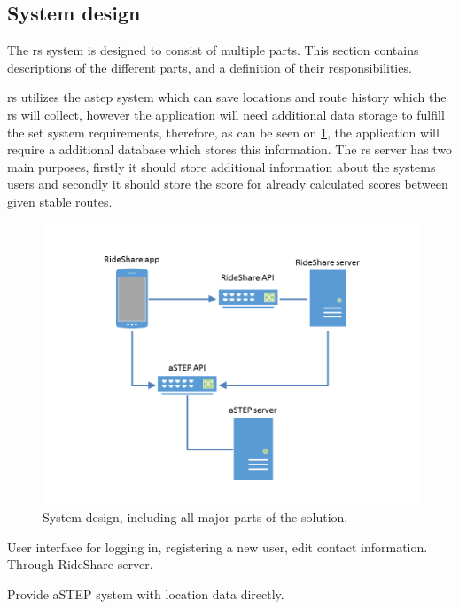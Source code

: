 \subsection{System design}
The \gls{rs} system is designed to consist of multiple parts.
This section contains descriptions of the different parts, and a definition of their responsibilities.

\gls{rs} utilizes the \gls{astep} system which can save locations and route history which the \gls{rs} will collect, however the application will need additional data storage to fulfill the set system requirements, therefore, as can be seen on \ref{fig:s2systemdesign}, the application will require a additional database which stores this information.
The \gls{rs} server has two main purposes, firstly it should store additional information about the systems users and secondly it should store the score for already calculated scores between given stable routes.

\begin{figure}[!h]
	\centering
	\includegraphics[width=\textwidth]{figures/SystemDesign.png}
	\caption{System design, including all major parts of the solution.}
	\label{fig:s2systemdesign}
\end{figure}


User interface for logging in, registering a new user, edit contact information.
Through RideShare server.

Provide aSTEP system with location data directly.



